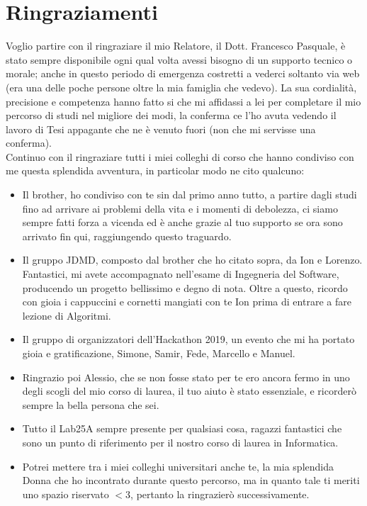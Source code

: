 \chapter{Ringraziamenti}
Voglio partire con il ringraziare il mio Relatore, il Dott. Francesco Pasquale, \`e stato sempre disponibile ogni qual volta avessi bisogno di un supporto tecnico o morale; anche in questo periodo di emergenza costretti a vederci soltanto via web (era una delle poche persone oltre la mia famiglia che vedevo). La sua cordialit\`a, precisione e competenza hanno fatto si che mi affidassi a lei per completare il mio percorso di studi nel migliore dei modi, la conferma ce l'ho avuta vedendo il lavoro di Tesi appagante che ne \`e venuto fuori (non che mi servisse una conferma).\\
Continuo con il ringraziare tutti i miei colleghi di corso che hanno condiviso con me questa splendida avventura, in particolar modo ne cito qualcuno:\\

\begin{itemize}
    \item Il brother, ho condiviso con te sin dal primo anno tutto, a partire dagli studi fino ad arrivare ai problemi della vita e i momenti di debolezza, ci siamo sempre fatti forza a vicenda ed \`e anche grazie al tuo supporto se ora sono arrivato fin qui, raggiungendo questo traguardo.
    \item Il gruppo JDMD, composto dal brother che ho citato sopra, da Ion e Lorenzo. Fantastici, mi avete accompagnato nell'esame di Ingegneria del Software, producendo un progetto bellissimo e degno di nota. Oltre a questo, ricordo con gioia i cappuccini e cornetti mangiati con te Ion prima di entrare a fare lezione di Algoritmi.
    \item Il gruppo di organizzatori dell'Hackathon 2019, un evento che mi ha portato gioia e gratificazione, Simone, Samir, Fede, Marcello e Manuel.
    \item Ringrazio poi Alessio, che se non fosse stato per te ero ancora fermo in uno degli scogli del mio corso di laurea, il tuo aiuto \`e stato essenziale, e ricorder\`o sempre la bella persona che sei.
    \item Tutto il Lab25A sempre presente per qualsiasi cosa, ragazzi fantastici che sono un punto di riferimento per il nostro corso di laurea in Informatica.
    \item Potrei mettere tra i miei colleghi universitari anche te, la mia splendida Donna che ho incontrato durante questo percorso, ma in quanto tale ti meriti uno spazio riservato $<$3, pertanto la ringrazier\`o successivamente.
\end{itemize}

